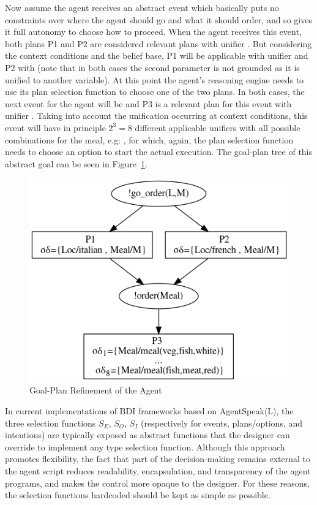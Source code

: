Now assume the agent receives an abstract event  which basically puts no constraints over where the agent should go and what it should order, and so gives it full autonomy to choose how to proceed. When the agent receives this event, both plans P1 and P2 are considered relevant plans with unifier . But considering the context conditions and the belief base, P1 will be applicable with unifier  and P2 with  (note that in both cases the second parameter is not grounded as it is unified to another variable). At this point the agent's reasoning engine needs to use its plan selection function to choose one of the two plans. In both cases, the next event for the agent will be  and P3 is a relevant plan for this event with unifier .  Taking into account the unification occurring at context conditions, this event will have in principle $2^3 = 8$ different applicable unifiers with all possible combinations for the meal, e.g: , for which, again, the plan selection function needs to choose an option to start the actual execution. The goal-plan tree of this abstract goal can be seen in Figure~\ref{fig:gp-tree}.

\begin{figure}[!t]
  \centering
  \includegraphics[width=0.70\linewidth]{ch_aamas2021/outfile.png}
  \caption{Goal-Plan Refinement of the Agent}
  \label{fig:gp-tree}
\end{figure}

In current implementations of BDI frameworks based on AgentSpeak(L), the three selection functions $S_E$, $S_O$, $S_I$ (respectively for events, plans/options, and intentions) are typically exposed as abstract functions that the designer can override to implement any type selection function. Although this approach promotes flexibility, the fact that part of the decision-making remains external to the agent script reduces readability, encapsulation, and transparency of the agent programs, and makes the control more opaque to the designer. For these reasons, the selection functions hardcoded should be kept as simple as possible.

